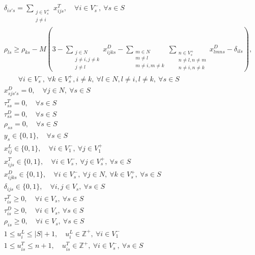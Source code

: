\documentclass[fontset=none]{ctexart}
\begin{document}
\begin{theorem}
{\begin{align}
 	& \delta_{is's} = \sum_{\substack{j \in V_s^+ \\ j \neq i}} x_{ijs}^T, \quad \forall i \in V_s^-, \ \forall s \in S \\
 	& \rho_{ls} \geq \rho_{ks} - M \left(3 - \sum_{\substack{j \in N \\ j \neq i, j \neq k \\ j \neq l}} x_{ijks}^D - \sum_{\substack{m \in N \\ m \neq l \\ m \neq i, m \neq k}}\sum_{\substack{n \in V_s^+ \\ n \neq l, n \neq m \\ n \neq i, n \neq k}} x_{lmns}^D - \delta_{ils}\right), \nonumber\\
 	& \qquad \forall i \in V_s^-, \ \forall k \in V_s^+, i \neq k, \ \forall l \in N, l \neq i, l \neq k, \ \forall s \in S \label{eq:conv-level-2-drone-nonoverlap-5}\\
    & x_{sjs's}^D = 0, \quad \forall j \in N,\ \forall s \in S \label{eq:conv-auxiliary-initial-1}\\
    & \tau_{ss}^T = 0, \quad \forall s \in S \\
    & \tau_{ss}^D = 0, \quad \forall s \in S \\
    & \rho_{ss} = 0, \quad \forall s \in S \label{eq:conv-auxiliary-initial-4}\\
    & y_s \in \{0, 1\}, \quad \forall s \in S \label{eq:conv-decision-variable}\\
    & x_{ij}^L \in \{0, 1\}, \quad \forall i \in V_1^-,\ \forall j \in V_1^+ \\
    & x_{ijs}^T \in \{0, 1\}, \quad \forall i \in V_s^-,\ \forall j \in V_s^+,\ \forall s \in S \\
    & x_{ijks}^D \in \{0, 1\}, \quad \forall i \in V_s^-,\ \forall j \in N,\ \forall k \in V_s^+,\ \forall s \in S \\
    & \delta_{ijs} \in \{0, 1\}, \quad \forall i, j \in V_s, \ \forall s \in S \\
    & \tau_{is}^T \geq 0, \quad \forall i \in V_s,\ \forall s \in S \\
    & \tau_{is}^D \geq 0, \quad \forall i \in V_s,\ \forall s \in S \\
    & \rho_{is} \geq 0, \quad \forall i \in V_s,\ \forall s \in S \\
    & 1 \leq u_i^L \leq |S| + 1, \quad u_i^L \in \mathbb{Z}^+, \ \forall i \in V_1^- \\
    & 1 \leq u_{is}^T \leq n + 1, \quad u_{is}^T \in \mathbb{Z}^+, \ \forall i \in V_s^-, \ \forall s \in S \label{eq:conv-auxiliary-variable}
\end{align}
}
\end{theorem}
\end{document}
